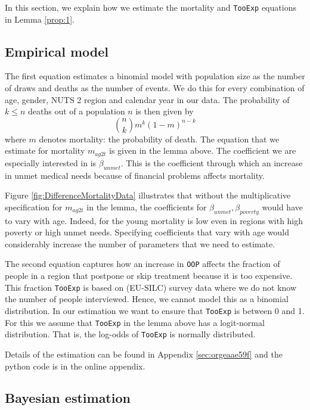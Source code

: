 \documentclass[a4paper,12pt]{article}
\begin{document}
In this section, we explain how we estimate the mortality and \texttt{TooExp} equations in Lemma \ref{prop:1}.

\subsection{Empirical model}
\label{sec:org2a19c0b}

The first equation estimates a binomial model with population size as the number of draws and deaths as the number of events. We do this for every combination of age, gender, NUTS 2 region and calendar year in our data. The probability of \(k \leq n\) deaths out of a population \(n\) is then given by
\begin{equation}
\label{eq:binomial}
\binom{n}{k} m^{k}(1-m)^{n-k}
\end{equation}
where \(m\) denotes mortality: the probability of death. The equation that we estimate for mortality \(m_{ag2t}\) is given in the lemma above. The coefficient we are especially interested in is \(\beta_{unmet}\). This is the coefficient through which an increase in unmet medical needs because of financial problems affects mortality.

Figure \ref{fig:DifferenceMortalityData} illustrates that without the multiplicative specification for \(m_{ag2t}\) in the lemma, the coefficients for \(\beta_{unmet}, \beta_{poverty}\) would have to vary with age. Indeed, for the young mortality is low even in regions with high poverty or high unmet needs. Specifying coefficients that vary with age would considerably increase the number of parameters that we need to estimate. 

The second equation captures how an increase in \texttt{OOP} affects the fraction of people in a region that postpone or skip treatment because it is too expensive. This fraction \texttt{TooExp} is based on (EU-SILC) survey data where we do not know the number of people interviewed. Hence, we cannot model this as a binomial distribution. In our estimation we want to ensure that \texttt{TooExp} is between 0 and 1. For this we assume that \texttt{TooExp} in the lemma above has a logit-normal distribution. That is, the log-odds of \texttt{TooExp} is normally distributed.

Details of the estimation can be found in Appendix \ref{sec:orgeaae59f} and the python code is in the online appendix.


\subsection{Bayesian estimation}
\label{sec:orgb8775d4}
\end{document}
